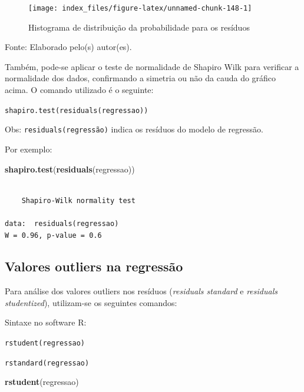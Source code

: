 \documentclass[12pt,brazil,oneside]{book}
\newenvironment{Shaded}{\begin{snugshade}}{\end{snugshade}}
\newcommand{\KeywordTok}[1]{\textcolor[rgb]{0.13,0.29,0.53}{\textbf{#1}}}
\newcommand{\NormalTok}[1]{#1}
\begin{document}
\begin{figure}[H]

{\centering \texttt{[image: index\_files/figure-latex/unnamed-chunk-148-1]} 

}

\caption{Histograma de distribuição da probabilidade para os resíduos}\label{fig:unnamed-chunk-148}
\end{figure}

Fonte: Elaborado pelo(s) autor(es).

Também, pode-se aplicar o teste de normalidade de Shapiro Wilk para verificar a normalidade dos dados, confirmando a simetria ou não da cauda do gráfico acima. O comando utilizado é o seguinte:

\texttt{shapiro.test(residuals(regressao))}

Obs: \texttt{residuals(regressão)} indica os resíduos do modelo de regressão.

Por exemplo:

\begin{Shaded}
\begin{Highlighting}[]
\KeywordTok{shapiro.test}\NormalTok{(}\KeywordTok{residuals}\NormalTok{(regressao))}
\end{Highlighting}
\end{Shaded}

\begin{verbatim}

    Shapiro-Wilk normality test

data:  residuals(regressao)
W = 0.96, p-value = 0.6
\end{verbatim}

\hypertarget{valores-outliers-na-regressao}{%
\subsection{Valores outliers na regressão}\label{valores-outliers-na-regressao}}

Para análise dos valores outliers nos resíduos (\emph{residuals standard} e \emph{residuals studentized}), utilizam-se os seguintes comandos:

Sintaxe no software R:

\texttt{rstudent(regressao)}

\texttt{rstandard(regressao)}

\begin{Shaded}
\begin{Highlighting}[]
\KeywordTok{rstudent}\NormalTok{(regressao)}
\end{Highlighting}
\end{Shaded}
\end{document}
